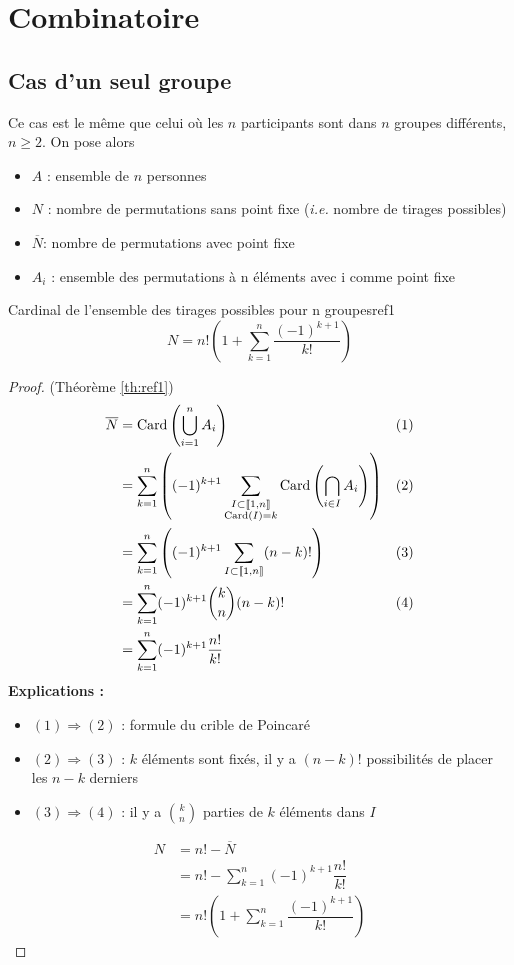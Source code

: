 \documentclass[a4paper, 12pt]{report}
\begin{document}
\chapter{Combinatoire}
    \section{Cas d'un seul groupe}
        \noindent Ce cas est le même que celui où les $n$ participants sont dans $n$ groupes différents, $n\geqslant 2$. On pose alors
        \begin{itemize}
            \item $A$ : ensemble de $n$ personnes 
            \item $N$ : nombre de permutations sans point fixe (\textit{i.e.} nombre de tirages possibles)
            \item $\overline{N}$: nombre de permutations avec point fixe
            \item $A_i$ : ensemble des permutations à n éléments avec i comme point fixe 
        \end{itemize}
        \begin{theorem}{Cardinal de l'ensemble des tirages possibles pour n groupes}{ref1}
            \[N=n !\left(1+\sum_{k=1}^{n}\dfrac{(-1)^{k+1}}{k !}\right)\]
        \end{theorem}
        \begin{proof}
            (Théorème \ref{th:ref1})
            \begin{align*}
                \overline{N}
                &= \mathop{\mathrm{Card}}\nolimits\left(\bigcup_{i=1}^{n}A_i\right) & (1) \\
                &= \sum_{k=1}^{n}\left((-1)^{k+1}\sum_{\substack{I\subset\left\llbracket1, n\right\rrbracket\\\mathop{\mathrm{Card}}\nolimits(I)=k}} \mathop{\mathrm{Card}}\nolimits\left(\bigcap_{i\in{I}}A_i\right)\right) & (2) \\
                &= \sum_{k=1}^{n}\left((-1)^{k+1}\sum_{I\subset\left\llbracket1, n\right\rrbracket} (n-k)!\right) & (3) \\
                &= \sum_{k=1}^{n}(-1)^{k+1}{\binom{k}{n}}(n-k)! & (4) \\
                &= \sum_{k=1}^{n}(-1)^{k+1}\dfrac{n !}{k !} 
            \end{align*}
            \textbf{Explications :}
            \begin{itemize}
                \item $(1)\Rightarrow(2)$ : formule du crible de Poincaré 
                \item $(2)\Rightarrow(3)$ : $k$ éléments sont fixés, il y a $(n-k)!$ possibilités de placer les $n-k$ derniers
                \item $(3)\Rightarrow(4)$ : il y a ${\displaystyle\binom{k}{n}}$ parties de $k$ éléments dans $I$ 
            \end{itemize}
            \begin{align*}
                N
                &= n !-\overline{N} \\
                &= n ! - \sum_{k=1}^{n}(-1)^{k+1}\dfrac{n !}{k !} \\
                &= n ! \left(1+\sum_{k=1}^{n}\dfrac{(-1)^{k+1}}{k !}\right)
            \end{align*}
        \end{proof}
\end{document}
